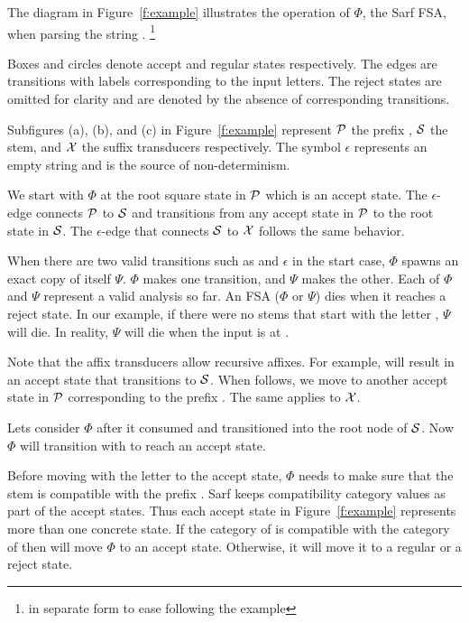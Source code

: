 \documentclass[11pt]{article}
\begin{document}

The diagram in Figure~\ref{f:example}
illustrates the operation of $\Phi$, the Sarf FSA,
when parsing the
string .
\footnote{ 
%
in separate form to ease following the example
}

Boxes and circles denote accept and regular
states respectively.
The edges are transitions with labels corresponding to
the input letters.
The reject states are omitted for clarity and are denoted
by the absence of corresponding transitions. 

Subfigures (a), (b), and (c) in Figure~\ref{f:example}
represent ${\cal P}$ the prefix ,
${\cal S}$ the stem, and ${\cal X}$ the suffix
transducers respectively. 
The symbol $\epsilon$ represents an empty string and is 
the source of non-determinism.

We start with $\Phi$ at the root square state in 
${\cal P}$ which is an accept state. 
The $\epsilon$-edge connects ${\cal P}$
to ${\cal S}$ and transitions from any accept state
in ${\cal P}$ to the root state in ${\cal S}$.
The $\epsilon$-edge that connects ${\cal S}$ to ${\cal X}$
follows the same behavior. 

When there are two valid transitions such as  
and $\epsilon$ in the start case, 
$\Phi$ spawns an exact copy of itself $\Psi$. 
$\Phi$ makes one transition, and $\Psi$ makes the other. 
Each of $\Phi$ and $\Psi$ represent a valid analysis so far. 
An FSA ($\Phi$ or $\Psi$) dies when it reaches a reject state.
In our example, if there were no stems that start 
with the letter , $\Psi$ will die. 
In reality, $\Psi$ will die when the input 
is at . 

Note that the affix transducers allow recursive 
affixes. 
For example,  will result in an accept state
that transitions to ${\cal S}$.
When  follows, we move to another accept state in 
${\cal P}$ corresponding to the prefix . 
The same applies to ${\cal X}$. 

Lets consider $\Phi$ after it consumed  
and transitioned into the root node of ${\cal S}$.
Now $\Phi$ will transition with  to reach an accept 
state. 

Before moving with the letter  to the accept state,
$\Phi$ needs to make sure that the stem  is compatible
with the prefix . 
Sarf keeps compatibility category values as part
of the accept states. 
Thus each accept state in Figure~\ref{f:example} represents
more than one concrete state. 
If the category of  is compatible with the category of
 then  will move $\Phi$ to an accept state. 
Otherwise, it will move it to a regular or a reject state. 
       
\end{document}
